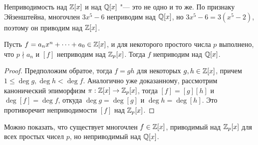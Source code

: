 \begin{note}
	Неприводимость над $\mathbb{Z}[x]$ и над $\mathbb{Q}[x]$ "--- это не одно и то же. По признаку Эйзенштейна, многочлен $3x^5 - 6$ неприводим над $\mathbb{Q}[x]$, но $3x^5 - 6 = 3(x^5 - 2)$, поэтому он приводим над $\mathbb{Z}[x]$.
\end{note}

\begin{proposition}
	Пусть $f = a_nx^n + \dotsb + a_0 \in \mathbb{Z}[x]$, и для некоторого простого числа $p$ выполнено, что $p \nmid a_n$ и $[f]$ неприводим над $\mathbb{Z}_p[x]$. Тогда $f$ неприводим над $\mathbb{Q}[x]$.
\end{proposition}

\begin{proof}
	Предположим обратое, тогда $f = gh$ для некоторых $g, h \in \mathbb{Z}[x]$, причем $1 \le \deg{g}, \deg{h} < \deg{f}$. Аналогично уже доказанному, рассмотрим канонический эпиморфизм $\pi: \mathbb{Z}[x] \to \mathbb{Z}_p[x]$, тогда $[f] = [g][h]$ и $\deg[f] = \deg{f}$, откуда $\deg{g} = \deg[g]$ и $\deg{h} = \deg[h]$. Это противоречит неприводимости $[f]$ над $\mathbb{Z}_p[x]$.
\end{proof}

\begin{note}
	Можно показать, что существует многочлен $f \in \mathbb{Z}[x]$, приводимый над $\mathbb{Z}_p[x]$ для всех простых чисел $p$, но неприводимый над $\mathbb{Q}[x]$.
\end{note}